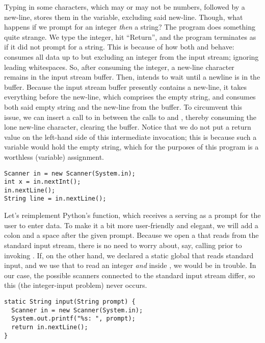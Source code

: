 Typing in some characters, which may or may not be numbers, followed by a new-line, stores them in the  variable, excluding said new-line. Though, what happens if we prompt for an integer \textit{then} a string? The program does something quite strange. We type the integer, hit ``Return'', and the program terminates as if it did not prompt for a string. This is because of how both  and  behave:  consumes all data up to but excluding an integer from the input stream; ignoring leading whitespaces. So, after consuming the integer, a new-line character remains in the input stream buffer. Then,  intends to wait until a newline is in the buffer. Because the input stream buffer presently contains a new-line, it takes everything before the new-line, which comprises the empty string, and consumes both said empty string and the new-line from the buffer. To circumvent this issue, we can insert a call to  in between the calls to  and , thereby consuming the lone new-line character, clearing the buffer. Notice that we do not put a return value on the left-hand side of this intermediate  invocation; this is because such a variable would hold the empty string, which for the purposes of this program is a worthless (variable) assignment.

\begin{verbatim}
Scanner in = new Scanner(System.in);
int x = in.nextInt();
in.nextLine();
String line = in.nextLine();
\end{verbatim}

\example Let's reimplement Python's  function, which receives a  serving as a prompt for the user to enter data. To make it a bit more user-friendly and elegant, we will add a colon and a space after the given prompt. Because we open a  that reads from the standard input stream, there is no need to worry about, say, calling  prior to invoking . If, on the other hand, we declared a static global  that reads standard input, and we use that to read an integer \textit{and} inside , we would be in trouble. In our case, the possible scanners connected to the standard input stream differ, so this (the integer-input problem) never occurs.

\begin{verbatim}
static String input(String prompt) {
  Scanner in = new Scanner(System.in);
  System.out.printf("%s: ", prompt);
  return in.nextLine();
}
\end{verbatim}


